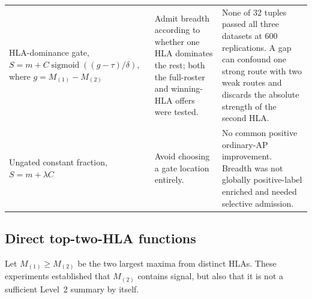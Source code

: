 \documentclass[11pt]{article}
\newcommand{\sigmoid}{\operatorname{sigmoid}}
\begin{document}
\begin{longtable}{@{}p{}p{}p{}@{}}
\addlinespace
HLA-dominance gate,
$S=m+C\sigmoid((g-\tau)/\delta)$, where $g=M_{(1)}-M_{(2)}$
& Admit breadth according to whether one HLA dominates the rest; both the
full-roster and winning-HLA offers were tested.
& None of 32 tuples passed all three datasets at 600 replications. A gap can
confound one strong route with two weak routes and discards the absolute
strength of the second HLA. \\
\addlinespace
Ungated constant fraction,
$S=m+\lambda C$
& Avoid choosing a gate location entirely.
& No common positive ordinary-AP improvement. Breadth was not globally
positive-label enriched and needed selective admission. \\
\bottomrule
\end{longtable}

\subsection{Direct top-two-HLA functions}

Let $M_{(1)}\geq M_{(2)}$ be the two largest maxima from distinct HLAs. These
experiments established that $M_{(2)}$ contains signal, but also that it is not
a sufficient Level~2 summary by itself.
\end{document}
